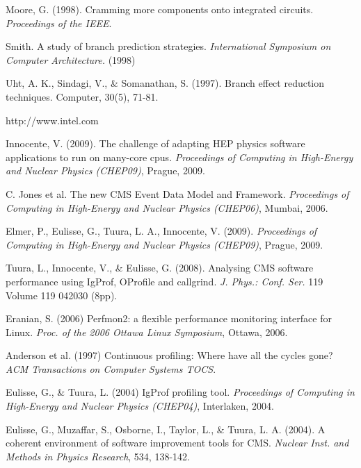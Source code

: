 \documentclass[a4paper]{jpconf}
\def\mybibliostyle{plain}
\def\bibliocommand{}
\def\mybibliostyle{apa}
\begin{document}
\begin{thebibliography}{0}


Moore, G. (1998). Cramming more components onto integrated circuits. {\itshape Proceedings of the IEEE}.

Smith. A study of branch prediction strategies. {\itshape International Symposium on Computer Architecture.} (1998)

Uht, A. K., Sindagi, V., \& Somanathan, S. (1997). Branch effect reduction techniques. Computer, 30(5), 71-81.

http://www.intel.com

Innocente, V. (2009). The challenge of adapting HEP physics software applications to run on many-core cpus. {\itshape Proceedings of Computing in High-Energy and Nuclear Physics (CHEP09)}, Prague, 2009.

C. Jones et al. The new CMS Event Data Model and Framework. {\itshape Proceedings of Computing in High-Energy and Nuclear Physics (CHEP06)}, Mumbai, 2006.

Elmer, P., Eulisse, G., Tuura, L. A., Innocente, V. (2009). {\itshape Proceedings of Computing in High-Energy and Nuclear Physics (CHEP09)}, Prague, 2009.

Tuura, L., Innocente, V., \& Eulisse, G. (2008). Analysing CMS software performance using IgProf, OProfile and callgrind. {\itshape J. Phys.: Conf. Ser.} 119 Volume 119 042030 (8pp).

Eranian, S. (2006) Perfmon2: a flexible performance monitoring interface for Linux. {\itshape Proc. of the 2006 Ottawa Linux Symposium}, Ottawa, 2006.

Anderson et al. (1997) Continuous profiling: Where have all the cycles gone? {\itshape ACM Transactions on Computer Systems TOCS}.

Eulisse, G., \& Tuura, L. (2004) IgProf profiling tool.
{\itshape Proceedings of Computing in High-Energy and Nuclear Physics (CHEP04)}, Interlaken, 2004.

Eulisse, G., Muzaffar, S., Osborne, I., Taylor, L., \& Tuura, L. A. (2004). A coherent environment of software improvement tools for CMS. {\itshape Nuclear Inst. and Methods in Physics Research}, 534, 138-142.
		
\end{thebibliography}
		
%
%


\bibliocommand
\end{document}
